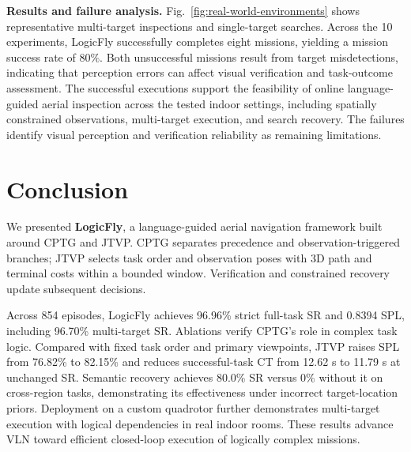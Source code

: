 \documentclass[letterpaper,10pt,journal]{IEEEtran}
\begin{document}
\textbf{Results and failure analysis.}
Fig.~\ref{fig:real-world-environments} shows representative multi-target inspections and single-target searches. Across the 10 experiments, LogicFly successfully completes eight missions, yielding a mission success rate of $80\%$. Both unsuccessful missions result from target misdetections, indicating that perception errors can affect visual verification and task-outcome assessment. The successful executions support the feasibility of online language-guided aerial inspection across the tested indoor settings, including spatially constrained observations, multi-target execution, and search recovery. The failures identify visual perception and verification reliability as remaining limitations.

\FloatBarrier
\section{Conclusion}
We presented \textbf{LogicFly}, a language-guided aerial navigation framework built around CPTG and JTVP. CPTG separates precedence and observation-triggered branches; JTVP selects task order and observation poses with 3D path and terminal costs within a bounded window. Verification and constrained recovery update subsequent decisions.

Across 854 episodes, LogicFly achieves 96.96\% strict full-task SR and 0.8394 SPL, including 96.70\% multi-target SR. Ablations verify CPTG's role in complex task logic. Compared with fixed task order and primary viewpoints, JTVP raises SPL from 76.82\% to 82.15\% and reduces successful-task CT from 12.62 s to 11.79 s at unchanged SR. Semantic recovery achieves 80.0\% SR versus 0\% without it on cross-region tasks, demonstrating its effectiveness under incorrect target-location priors. Deployment on a custom quadrotor further demonstrates multi-target execution with logical dependencies in real indoor rooms. These results advance VLN toward efficient closed-loop execution of logically complex missions.


\end{document}
